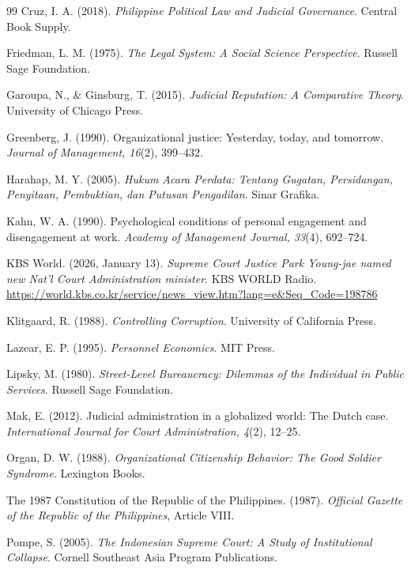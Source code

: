 \documentclass[12pt, a4paper]{article}
\begin{document}
\begin{thebibliography}{99}
Cruz, I. A. (2018). \textit{Philippine Political Law and Judicial Governance}. Central Book Supply.

Friedman, L. M. (1975). \textit{The Legal System: A Social Science Perspective}. Russell Sage Foundation.

Garoupa, N., \& Ginsburg, T. (2015). \textit{Judicial Reputation: A Comparative Theory}. University of Chicago Press.

Greenberg, J. (1990). Organizational justice: Yesterday, today, and tomorrow. \textit{Journal of Management, 16}(2), 399--432.

Harahap, M. Y. (2005). \textit{Hukum Acara Perdata: Tentang Gugatan, Persidangan, Penyitaan, Pembuktian, dan Putusan Pengadilan}. Sinar Grafika.

Kahn, W. A. (1990). Psychological conditions of personal engagement and disengagement at work. \textit{Academy of Management Journal, 33}(4), 692--724.

KBS World. (2026, January 13). \textit{Supreme Court Justice Park Young-jae named new Nat'l Court Administration minister}. KBS WORLD Radio. \url{https://world.kbs.co.kr/service/news_view.htm?lang=e&Seq_Code=198786}

Klitgaard, R. (1988). \textit{Controlling Corruption}. University of California Press.

Lazear, E. P. (1995). \textit{Personnel Economics}. MIT Press.

Lipsky, M. (1980). \textit{Street-Level Bureaucracy: Dilemmas of the Individual in Public Services}. Russell Sage Foundation.

Mak, E. (2012). Judicial administration in a globalized world: The Dutch case. \textit{International Journal for Court Administration, 4}(2), 12--25.

Organ, D. W. (1988). \textit{Organizational Citizenship Behavior: The Good Soldier Syndrome}. Lexington Books.

The 1987 Constitution of the Republic of the Philippines. (1987). \textit{Official Gazette of the Republic of the Philippines}, Article VIII.

Pompe, S. (2005). \textit{The Indonesian Supreme Court: A Study of Institutional Collapse}. Cornell Southeast Asia Program Publications.


\end{thebibliography}
\end{document}

